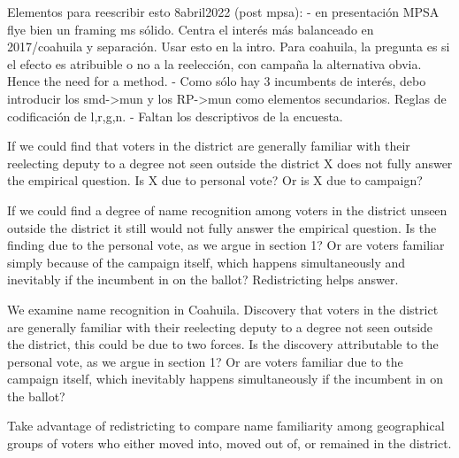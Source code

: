 
Elementos para reescribir esto 8abril2022 (post mpsa):
- en presentación MPSA flye bien un framing ms sólido. Centra el interés más balanceado en 2017/coahuila y separación. Usar esto en la intro. Para coahuila, la pregunta es si el efecto es atribuible o no a la reelección, con campaña la alternativa obvia. Hence the need for a method.
- Como sólo hay 3 incumbents de interés, debo introducir los smd->mun y los RP->mun como elementos secundarios. Reglas de codificación de l,r,g,n.
- Faltan los descriptivos de la encuesta. 




If we could find that voters in the district are generally familiar with their reelecting deputy to a degree not seen outside the district X does not fully answer the empirical question. Is X due to personal vote? Or is X due to campaign? 

If we could find a degree of name recognition among voters in the district unseen outside the district it still would not fully answer the empirical question. Is the finding due to the personal vote, as we argue in section 1? Or are voters familiar simply because of the campaign itself, which happens simultaneously and inevitably if the incumbent in on the ballot? Redistricting helps answer.

We examine name recognition in Coahuila. Discovery that voters in the district are generally familiar with their reelecting deputy to a degree not seen outside the district, this could be due to two forces. Is the discovery attributable to the personal vote, as we argue in section 1? Or are voters familiar due to the campaign itself, which inevitably happens simultaneously if the incumbent in on the ballot?  


Take advantage of redistricting to compare name familiarity among geographical groups of voters who either moved into, moved out of, or remained in the district. 

